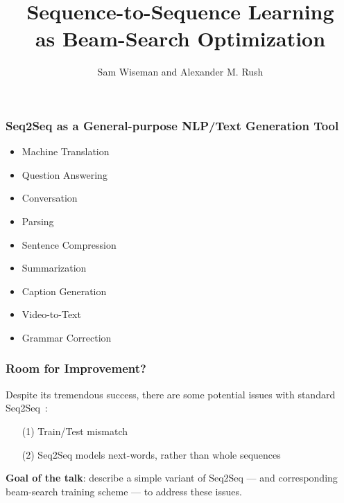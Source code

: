 \documentclass{beamer}
\title{Sequence-to-Sequence Learning\\ as Beam-Search Optimization}
\institute{
\centering
\texttt{[image: SEASLogo.png]} 
}
\author{Sam Wiseman and Alexander M. Rush}
\date{}
\newcommand{\air}{\vspace{0.25cm}}
\newcommand{\Cite}[1]{{\footnotesize\cite{#1}}}
\let\realcitep\citep
\renewcommand*{\citep}[1]{{\footnotesize \realcitep{#1}}}
\begin{document}
\begin{frame}
	\maketitle
\end{frame}

\begin{frame}
    \frametitle{Seq2Seq as a General-purpose NLP/Text Generation Tool}

  \begin{itemize}
  \item Machine Translation \Cite{kalchbrenner2013recurrent,sutskever2014sequence, Cho2014, bahdanau2014neural,luong15effective} 
  \item Question Answering \Cite{Hermann2015} 
  \item Conversation \Cite{Vinyals2015}
  \item Parsing \Cite{vinyals15grammar}
  \item Sentence Compression \Cite{filippova15sentence}
  \item Summarization \Cite{Rush2015} 
  \item Caption Generation \Cite{Xu2015}
  \item Video-to-Text \Cite{Venugopalan2015}
  \item Grammar Correction \Cite{Schmaltz2016}
  \end{itemize}
  
\end{frame}

\begin{frame}
\frametitle{Room for Improvement?}
Despite its tremendous success, there are some potential issues with standard Seq2Seq~\citep{ranzato16sequence,bengio15scheduled}:

\begin{itemize}
\air
\item[(1)] Train/Test mismatch
\air
\item[(2)] Seq2Seq models next-words, rather than whole sequences
\end{itemize}

\air
\air
\textbf{Goal of the talk}: describe a simple variant of Seq2Seq --- and corresponding beam-search training scheme --- to address these issues.


\end{frame}
\end{document}
